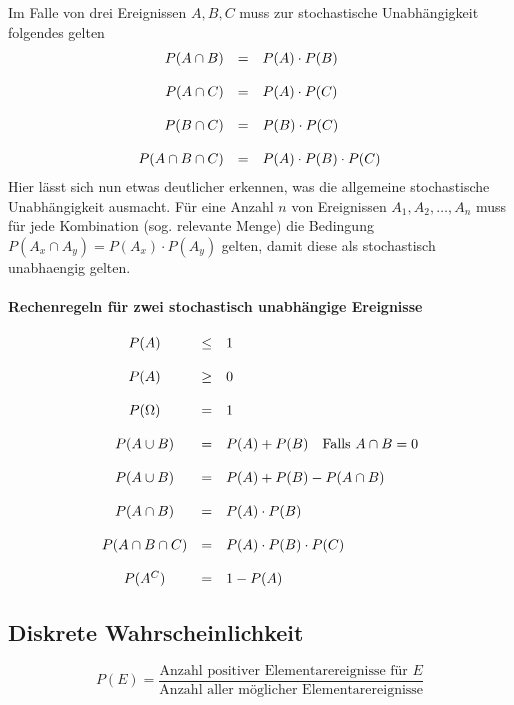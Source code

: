 Im Falle von drei Ereignissen $A,B,C$ muss zur stochastische
Unabhängigkeit folgendes gelten
\[ \begin{array}{r c l}
	P(A \cap B)
		& = 
		& P(A) \cdot P(B) \\
	& & \\
	P(A \cap C)
		& =
		& P(A) \cdot P(C) \\
	& & \\
	P(B \cap C)
		& =
		& P(B) \cdot P(C) \\
	& & \\
	P(A \cap B \cap C)
		& =
		& P(A) \cdot P(B) \cdot P(C)
\end{array} \]
Hier lässt sich nun etwas deutlicher erkennen, was die allgemeine
stochastische Unabhängigkeit ausmacht. 
Für eine Anzahl $n$ von Ereignissen 
$A_1, A_2, \dots , A_n $ 
muss für jede Kombination (sog. relevante Menge) die Bedingung
$P(A_x \cap A_y) = P(A_x) \cdot P(A_y)$ gelten, damit diese
als \gls{stochastisch unabhaengig} gelten. 

\paragraph{Rechenregeln für zwei stochastisch unabhängige Ereignisse}
\[ \begin{array}{c c l}
	P(A)	
		& \leq
		& 1 \\
	& & \\
	P(A) 
		& \geq 
		& 0 \\
	& & \\
	P(\Omega) 
		& = 
		& 1 \\
	& & \\
	P(A \cup B) 
		& = 
		& P(A) + P(B) \quad \text{Falls } A \cap B = 0 \\
	& & \\
	P(A \cup B) 
		& = 
		& P(A) + P(B) - P(A \cap B) \\
	& & \\
	P(A \cap B) 
		& = 
		& P(A) \cdot P(B) \\
	& & \\
	P(A \cap B \cap C) 
		& = 
		& P(A) \cdot P(B) \cdot P(C) \\
	& & \\
	P(A^C) 
		& = 
		& 1 - P(A)
\end{array} \]
	
\subsection{Diskrete Wahrscheinlichkeit}
\[ 
	P(E)
	= \frac{\text{Anzahl positiver Elementarereignisse für } E}{
		\text{Anzahl aller möglicher Elementarereignisse}}
\]

